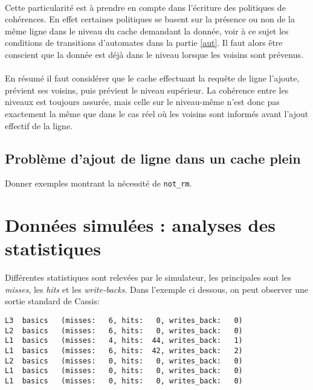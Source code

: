 \paragraph{}
Cette particularité est à prendre en compte dans l'écriture des politiques de cohérences. En effet certaines politiques se basent sur la présence ou non de la même ligne dans le niveau du cache demandant la donnée, voir à ce sujet les conditions de transitions d'automates dans la partie \ref{aut}. Il faut alors être conscient que la donnée est déjà dans le niveau lorsque les voisins sont prévenus.

\paragraph{}
En résumé il faut considérer que le cache effectuant la requête de ligne l'ajoute, prévient ses voisins, puis prévient le niveau supérieur. La cohérence entre les niveaux est toujours assurée, mais celle sur le niveau-même n'est donc pas exactement la même que dans le cas réel où les voisins sont informés avant l'ajout effectif de la ligne.


\subsection{Problème d'ajout de ligne dans un cache plein}


Donner exemples montrant la nécessité de \verb:not_rm:.

\section{Données simulées : analyses des statistiques}

Différentes statistiques sont relevées par le simulateur, les principales sont les \emph{misses}, les \emph{hits} et les \emph{write-backs}. Dans l'exemple ci dessous, on peut observer une sortie standard de \textsf{Cassis}: \\

\begin{lstlisting}
L3  basics   (misses:   6, hits:   0, writes_back:   0)
L2  basics   (misses:   6, hits:   0, writes_back:   0)
L1  basics   (misses:   4, hits:  44, writes_back:   1)
L1  basics   (misses:   6, hits:  42, writes_back:   2)
L2  basics   (misses:   0, hits:   0, writes_back:   0)
L1  basics   (misses:   0, hits:   0, writes_back:   0)
L1  basics   (misses:   0, hits:   0, writes_back:   0)
\end{lstlisting}


